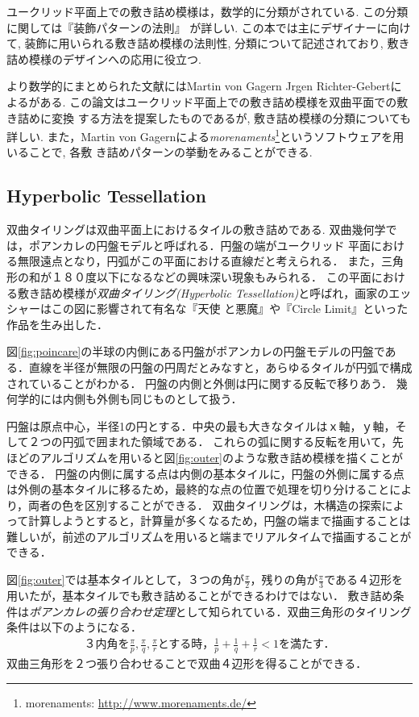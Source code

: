 ユークリッド平面上での敷き詰め模様は，数学的に分類がされている.
この分類に関しては『装飾パターンの法則』
\cite{tessellationDesign}が詳しい.
この本では主にデザイナーに向けて, 装飾に用いられる敷き詰め模様の法則性,
分類について記述されており, 敷き詰め模様のデザインへの応用に役立つ.

より数学的にまとめられた文献にはMartin von Gagern \dot Jrgen
Richter-Gebertによる\cite{hyperbolization}がある.
この論文はユークリッド平面上での敷き詰め模様を双曲平面での敷き詰めに変換
する方法を提案したものであるが, 敷き詰め模様の分類についても詳しい.
また，Martin von Gagernによる\emph{morenaments}\footnote{morenaments:
\url{http://www.morenaments.de/}}というソフトウェアを用いることで, 各敷
き詰めパターンの挙動をみることができる.

\subsection{Hyperbolic Tessellation}

双曲タイリングは双曲平面上におけるタイルの敷き詰めである.
双曲幾何学では，ポアンカレの円盤モデルと呼ばれる．円盤の端がユークリッド
平面における無限遠点となり，円弧がこの平面における直線だと考えられる．
また，三角形の和が１８０度以下になるなどの興味深い現象もみられる．
この平面における敷き詰め模様が\emph{双曲タイリング}{\it (Hyperbolic
Tessellation)}と呼ばれ，画家のエッシャーはこの図に影響されて有名な『天使
と悪魔』や『Circle Limit』といった作品を生み出した．

図\ref{fig:poincare}の半球の内側にある円盤がポアンカレの円盤モデルの円盤である．直線を半径が無限の円盤の円周だとみなすと，あらゆるタイルが円弧で構成されていることがわかる．
円盤の内側と外側は円に関する反転で移りあう．
幾何学的には内側も外側も同じものとして扱う．

円盤は原点中心，半径1の円とする．中央の最も大きなタイルはｘ軸，ｙ軸，そして２つの円弧で囲まれた領域である．
これらの弧に関する反転を用いて，先ほどのアルゴリズムを用いると図\ref{fig:outer}のような敷き詰め模様を描くことができる．
円盤の内側に属する点は内側の基本タイルに，円盤の外側に属する点は外側の基本タイルに移るため，最終的な点の位置で処理を切り分けることにより，両者の色を区別することができる．
双曲タイリングは，木構造の探索によって計算しようとすると，計算量が多くなるため，円盤の端まで描画することは難しいが，前述のアルゴリズムを用いると端までリアルタイムで描画することができる．

図\ref{fig:outer}では基本タイルとして，３つの角が$\frac{\pi}{2}$，残りの角が$\frac{\pi}{3}$である４辺形を用いたが，基本タイルでも敷き詰めることができるわけではない．
敷き詰め条件は\emph{ポアンカレの張り合わせ定理}として知られている．双曲三角形のタイリング条件は以下のようになる．
\begin{eqnarray*}
\text{３内角を}\frac{\pi}{p},\frac{\pi}{q},\frac{\pi}{r}\text{とする時，}
 \frac{1}{p} + \frac{1}{q} + \frac{1}{r} < 1 \text{を満たす．}
\end{eqnarray*}
双曲三角形を２つ張り合わせることで双曲４辺形を得ることができる．


